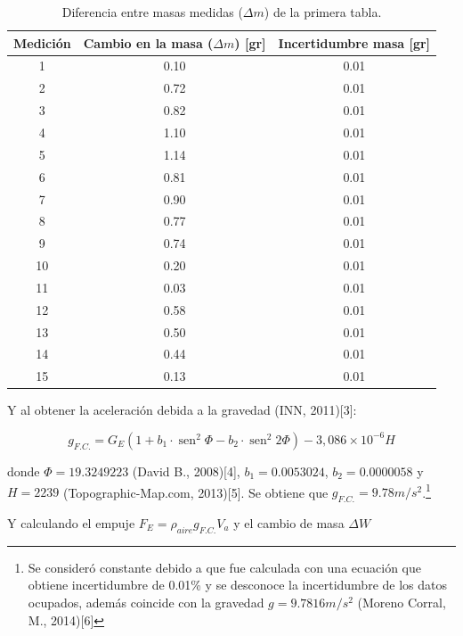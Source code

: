 \documentclass[a4paper]{article}
\begin{document}
\begin{table}[H]
  \centering
    \begin{tabular}{|c|c|c|} \hline
    Medición & Cambio en la masa ($\Delta m$) [gr] & Incertidumbre masa [gr] \\ \hline
    1     & 0.10  & 0.01 \\ \hline
    2     & 0.72  & 0.01 \\ \hline
    3     & 0.82  & 0.01 \\ \hline
    4     & 1.10  & 0.01 \\ \hline
    5     & 1.14  & 0.01 \\ \hline
    6     & 0.81  & 0.01 \\ \hline
    7     & 0.90  & 0.01 \\ \hline
    8     & 0.77  & 0.01 \\ \hline
    9     & 0.74  & 0.01 \\ \hline
    10    & 0.20  & 0.01 \\ \hline
    11    & 0.03  & 0.01 \\ \hline
    12    & 0.58  & 0.01 \\ \hline
    13    & 0.50  & 0.01 \\ \hline
    14    & 0.44  & 0.01 \\ \hline
    15    & 0.13  & 0.01 \\ \hline
    \end{tabular}%
    \caption{Diferencia entre masas medidas ($\Delta m$) de la primera tabla.}
\end{table}%

Y al obtener la aceleración debida a la gravedad (INN, 2011)[3]:

$$g_{F.C.}= G_{E}\left(1+b_{1}\cdot \operatorname{sen}^{2} \Phi-b_{2}\cdot \operatorname{sen}^{2} 2 \Phi\right)-3,086\times10^{-6} H$$

donde $\Phi = 19.3249223$ (David B., 2008)[4], $b_{1} = 0.0053024$, $b_{2} = 0.0000058$ y $H = 2239$ (Topographic-Map.com, 2013)[5]. Se obtiene que $g_{F.C.}=9.78 m/s^2$.\footnote{Se consideró constante debido a que fue calculada con una ecuación que obtiene incertidumbre de 0.01\% y se desconoce la incertidumbre de los datos ocupados, además coincide con la gravedad $g=9.7816 m/s^2$ (Moreno Corral, M., 2014)[6]}

Y calculando el empuje $F_E = \rho_{aire} g_{F.C.} V_a$ y el cambio de masa $\Delta W$
\end{document}
